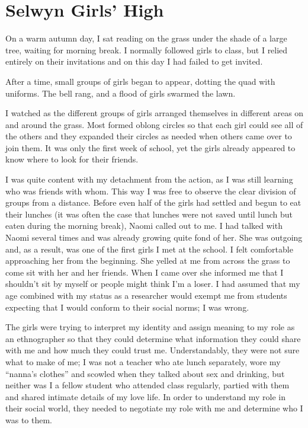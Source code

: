 
\section{Selwyn Girls' High}
On a warm autumn day, I sat reading on the grass under the shade of a large tree, waiting for morning break. I normally followed girls to class, but I relied entirely on their invitations and on this day I had failed to get invited. 


After a time, small groups of girls began to appear, dotting the quad with uniforms. The bell rang, and a flood of girls swarmed the lawn. 

I watched as the different groups of girls arranged themselves in different areas on and around the grass. Most formed oblong circles so that each girl could see all of the others and they expanded their circles as needed when others came over to join them. It was only the first week of school, yet the girls already appeared to know where to look for their friends. 

I was quite content with my detachment from the action, as I was still learning who was friends with whom. This way I was free to observe the clear division of groups from a distance. Before even half of the girls had settled and begun to eat their lunches (it was often the case that lunches were not saved until lunch but eaten during the morning break), Naomi called out to me. I had talked with Naomi several times and was already growing quite fond of her. She was outgoing and, as a result, was one of the first girls I met at the school. I felt comfortable approaching her from the beginning. She yelled at me from across the grass to come sit with her and her friends. When I came over she informed me that I shouldn't sit by myself or people might think I'm a loser. I had assumed that my age combined with my status as a researcher would exempt me from students expecting that I would conform to their social norms; I was wrong.

The girls were trying to interpret my identity and assign meaning to my role as an ethnographer so that they could determine what information they could share with me and how much they could trust me. Understandably, they were not sure what to make of me; I was not a teacher who ate lunch separately, wore my ``nanna's clothes'' and scowled when they talked about sex and drinking, but neither was I a fellow student who attended class regularly, partied with them and shared intimate details of my love life. In order to understand my role in their social world, they needed to negotiate my role with me and determine who I was to them.

